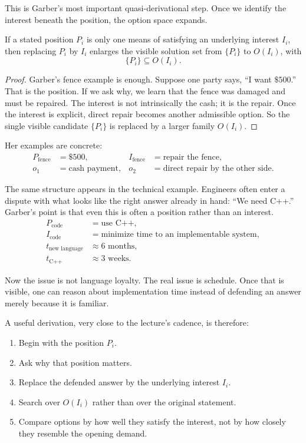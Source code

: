 This is Garber's most important quasi-derivational step. Once we identify the interest beneath the position, the option space expands.

\begin{proposition}
If a stated position \(P_i\) is only one means of satisfying an underlying interest \(I_i\), then replacing \(P_i\) by \(I_i\) enlarges the visible solution set from \(\{P_i\}\) to \(O(I_i)\), with
\[
\{P_i\} \subseteq O(I_i).
\]
\end{proposition}

\begin{proof}
Garber's fence example is enough. Suppose one party says, ``I want \(\$500\).'' That is the position. If we ask why, we learn that the fence was damaged and must be repaired. The interest is not intrinsically the cash; it is the repair. Once the interest is explicit, direct repair becomes another admissible option. So the single visible candidate \(\{P_i\}\) is replaced by a larger family \(O(I_i)\).
\end{proof}

Her examples are concrete:
\begin{align}
P_{\text{fence}} &= \$500, &
I_{\text{fence}} &= \text{repair the fence},\\
o_1 &= \text{cash payment}, &
o_2 &= \text{direct repair by the other side}.
\end{align}

The same structure appears in the technical example. Engineers often enter a dispute with what looks like the right answer already in hand: ``We need C++.'' Garber's point is that even this is often a position rather than an interest.
\begin{align}
P_{\text{code}} &= \text{use C++},\\
I_{\text{code}} &= \text{minimize time to an implementable system},\\
t_{\text{new language}} &\approx 6 \text{ months},\\
t_{\text{C++}} &\approx 3 \text{ weeks}.
\end{align}

Now the issue is not language loyalty. The real issue is schedule. Once that is visible, one can reason about implementation time instead of defending an answer merely because it is familiar.

A useful derivation, very close to the lecture's cadence, is therefore:

\begin{enumerate}
\item Begin with the position \(P_i\).
\item Ask why that position matters.
\item Replace the defended answer by the underlying interest \(I_i\).
\item Search over \(O(I_i)\) rather than over the original statement.
\item Compare options by how well they satisfy the interest, not by how closely they resemble the opening demand.
\end{enumerate}

